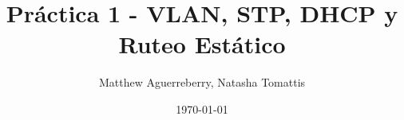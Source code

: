 \documentclass[letterpaper,12pt]{article}
\begin{document}
\title{Práctica 1 - VLAN, STP, DHCP y Ruteo Estático}
\author{Matthew Aguerreberry, Natasha Tomattis}
\date{\today}
\maketitle

\end{document}

